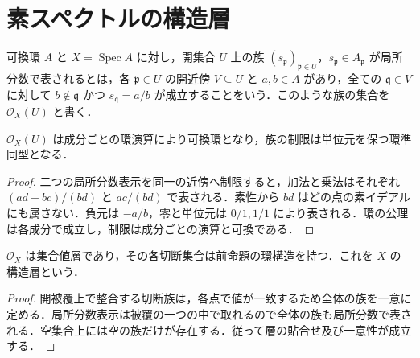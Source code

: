 \section{素スペクトルの構造層}
\begin{defn}[局所分数による切断]
可換環 $A$ と $X=\operatorname{Spec}A$ に対し，開集合 $U$ 上の族 $(s_{\mathfrak p})_{\mathfrak p\in U}$，$s_{\mathfrak p}\in A_{\mathfrak p}$ が局所分数で表されるとは，各 $\mathfrak p\in U$ の開近傍 $V\subseteq U$ と $a,b\in A$ があり，全ての $\mathfrak q\in V$ に対して $b\notin\mathfrak q$ かつ $s_{\mathfrak q}=a/b$ が成立することをいう．このような族の集合を $\mathcal O_X(U)$ と書く．
\end{defn}
\begin{prop}[構造層の環演算]
$\mathcal O_X(U)$ は成分ごとの環演算により可換環となり，族の制限は単位元を保つ環準同型となる．
\end{prop}
\begin{proof}
二つの局所分数表示を同一の近傍へ制限すると，加法と乗法はそれぞれ $(ad+bc)/(bd)$ と $ac/(bd)$ で表される．素性から $bd$ はどの点の素イデアルにも属さない．負元は $-a/b$，零と単位元は $0/1,1/1$ により表される．環の公理は各成分で成立し，制限は成分ごとの演算と可換である．
\end{proof}
\begin{prop}[構造層の層性]
$\mathcal O_X$ は集合値層であり，その各切断集合は前命題の環構造を持つ．これを $X$ の構造層という．
\end{prop}
\begin{proof}
開被覆上で整合する切断族は，各点で値が一致するため全体の族を一意に定める．局所分数表示は被覆の一つの中で取れるので全体の族も局所分数で表される．空集合上には空の族だけが存在する．従って層の貼合せ及び一意性が成立する．
\end{proof}
